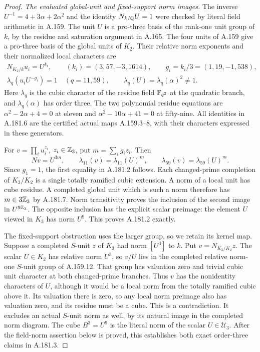 \begin{proof}
\emph{The evaluated global-unit and fixed-support norm images.}
The inverse \(U^{-1}=4+3\alpha+2\alpha^2\) and the identity
\(N_{k/\mathbb Q}U=1\) were checked by literal field arithmetic in
A.159.  The unit \(U\) is a pro-three basis of the rank-one
unit group of \(k\), by the residue and saturation argument in
A.165.  The four units of A.159 give a pro-three basis of the
global units of \(K_2\).  Their relative norm exponents and their
normalized local characters are
\[
\begin{gathered}
 N_{K_2/k}u_i=U^{k_i},\qquad
 (k_i)=(3,57,-3,1614),\qquad
 g_i=k_i/3=(1,19,-1,538),\\
 \lambda_q(u_iU^{-g_i})=1\quad(q=11,59),\qquad
 \lambda_q(U)=\lambda_q(\alpha)^2\ne1.
\end{gathered}
\tag{A.181.6}
\]
Here \(\lambda_q\) is the cubic character of the residue field
\(\mathbb F_{q^2}\) at the quadratic branch, and
\(\lambda_q(\alpha)\) has order three.  The two polynomial
residue equations are
\(\alpha^2-2\alpha+4=0\) at eleven and
\(\alpha^2-10\alpha+41=0\) at fifty-nine.
All identities in A.181.6 are the certified actual maps
A.159.3--8, with their characters expressed in these generators.

For \(v=\prod_i u_i^{z_i}\), \(z_i\in\mathbb Z_3\), put
\(m=\sum_i g_i z_i\).  Then
\[
 Nv=U^{3m},\qquad
 \lambda_{11}(v)=\lambda_{11}(U)^m,\qquad
 \lambda_{59}(v)=\lambda_{59}(U)^m.
\tag{A.181.7}
\]
Since \(g_1=1\), the first equality in A.181.2 follows.
Each changed-prime completion of \(K_3/K_2\) is a single
totally ramified cubic extension.  A norm of a local unit has cube
residue.  A completed global unit which is such a norm therefore
has \(m\in3\mathbb Z_3\) by A.181.7.  Norm transitivity proves the
inclusion of the second image in \(U^{9\mathbb Z_3}\).
The opposite inclusion has the explicit scalar preimage: the
element \(U\) viewed in \(K_3\) has norm \(U^9\).
This proves A.181.2 exactly.

The fixed-support obstruction uses the larger group, so we retain
its kernel map.  Suppose a completed \(S\)-unit \(z\) of
\(K_3\) had norm \([U^3]\) to \(k\).  Put
\(v=N_{K_3/K_2}z\).  The scalar \(U\in K_2\) has relative
norm \(U^3\), so \(v/U\) lies in the completed relative
norm-one \(S\)-unit group of A.159.12.  That group has valuation
zero and trivial cubic unit character at both changed-prime branches.
Thus \(v\) has the nonidentity characters of \(U\), although
it would be a local norm from the totally ramified cubic above it.
Its valuation there is zero, so any local norm preimage also has
valuation zero, and its residue must be a cube.  This is a contradiction.
It excludes an actual \(S\)-unit norm as well, by its natural image
in the completed norm diagram.  The cube \(B^3=U^9\) is the
literal norm of the scalar \(U\in\mathcal U_3\).
After the field-norm assertion below is proved, this establishes
both exact order-three claims in A.181.3.


\end{proof}
